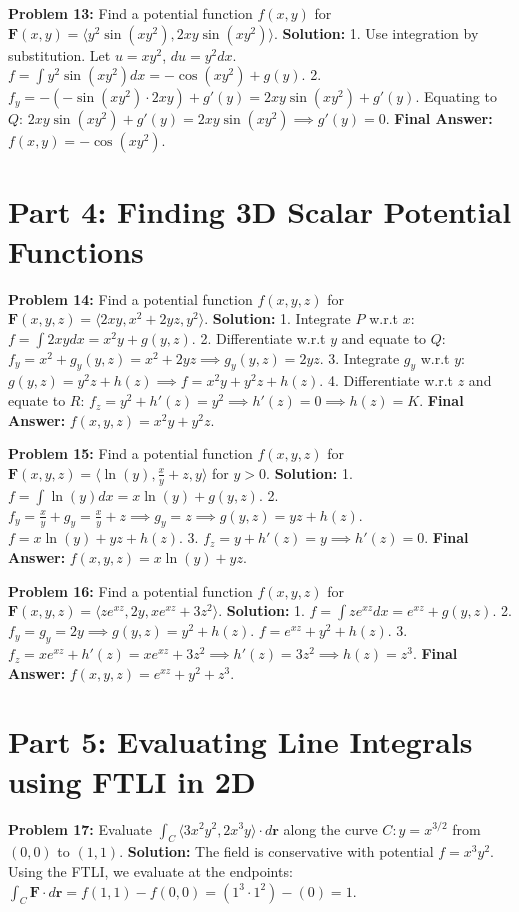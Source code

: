 \documentclass[12pt]{article}
\begin{document}
\textbf{Problem 13:} Find a potential function $f(x,y)$ for $\mathbf{F}(x,y) = \langle y^2 \sin(xy^2), 2xy \sin(xy^2) \rangle$.
\textbf{Solution:} 
1. Use integration by substitution. Let $u = xy^2$, $du = y^2 dx$. 
$f = \int y^2 \sin(xy^2) dx = -\cos(xy^2) + g(y)$.
2. $f_y = -\left(-\sin(xy^2) \cdot 2xy\right) + g'(y) = 2xy \sin(xy^2) + g'(y)$.
Equating to $Q$: $2xy \sin(xy^2) + g'(y) = 2xy \sin(xy^2) \implies g'(y) = 0$.
\textbf{Final Answer:} $f(x,y) = -\cos(xy^2)$.

\section*{Part 4: Finding 3D Scalar Potential Functions}

\textbf{Problem 14:} Find a potential function $f(x,y,z)$ for $\mathbf{F}(x,y,z) = \langle 2xy, x^2 + 2yz, y^2 \rangle$.
\textbf{Solution:} 
1. Integrate $P$ w.r.t $x$: $f = \int 2xy dx = x^2y + g(y,z)$.
2. Differentiate w.r.t $y$ and equate to $Q$: $f_y = x^2 + g_y(y,z) = x^2 + 2yz \implies g_y(y,z) = 2yz$.
3. Integrate $g_y$ w.r.t $y$: $g(y,z) = y^2z + h(z) \implies f = x^2y + y^2z + h(z)$.
4. Differentiate w.r.t $z$ and equate to $R$: $f_z = y^2 + h'(z) = y^2 \implies h'(z) = 0 \implies h(z) = K$.
\textbf{Final Answer:} $f(x,y,z) = x^2y + y^2z$.

\textbf{Problem 15:} Find a potential function $f(x,y,z)$ for $\mathbf{F}(x,y,z) = \langle \ln(y), \frac{x}{y} + z, y \rangle$ for $y>0$.
\textbf{Solution:} 
1. $f = \int \ln(y) dx = x\ln(y) + g(y,z)$.
2. $f_y = \frac{x}{y} + g_y = \frac{x}{y} + z \implies g_y = z \implies g(y,z) = yz + h(z)$. 
$f = x\ln(y) + yz + h(z)$.
3. $f_z = y + h'(z) = y \implies h'(z) = 0$.
\textbf{Final Answer:} $f(x,y,z) = x\ln(y) + yz$.

\textbf{Problem 16:} Find a potential function $f(x,y,z)$ for $\mathbf{F}(x,y,z) = \langle z e^{xz}, 2y, x e^{xz} + 3z^2 \rangle$.
\textbf{Solution:} 
1. $f = \int z e^{xz} dx = e^{xz} + g(y,z)$.
2. $f_y = g_y = 2y \implies g(y,z) = y^2 + h(z)$. $f = e^{xz} + y^2 + h(z)$.
3. $f_z = x e^{xz} + h'(z) = x e^{xz} + 3z^2 \implies h'(z) = 3z^2 \implies h(z) = z^3$.
\textbf{Final Answer:} $f(x,y,z) = e^{xz} + y^2 + z^3$.

\section*{Part 5: Evaluating Line Integrals using FTLI in 2D}

\textbf{Problem 17:} Evaluate $\int_C \langle 3x^2y^2, 2x^3y \rangle \cdot d\mathbf{r}$ along the curve $C: y = x^{3/2}$ from $(0,0)$ to $(1,1)$.
\textbf{Solution:} The field is conservative with potential $f = x^3y^2$. Using the FTLI, we evaluate at the endpoints: 
$\int_C \mathbf{F} \cdot d\mathbf{r} = f(1,1) - f(0,0) = (1^3 \cdot 1^2) - (0) = 1$.
\end{document}

